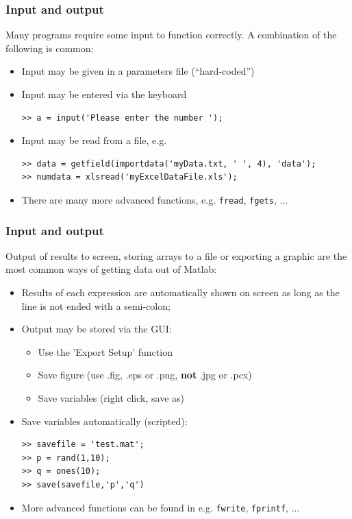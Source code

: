 \documentclass[11pt,table,final,fleqn,xcolor={usenames,dvipsnames},unknownkeysallowed,handout]{beamer}
\begin{document}
\begin{frame}[fragile]
 \frametitle{Input and output}
 Many programs require some input to function correctly. A combination of the following is common:
 \begin{itemize}[<+->]
   \item Input may be given in a parameters file (``hard-coded'')
   \item Input may be entered via the keyboard
   \begin{lstlisting}
>> a = input('Please enter the number ');
   \end{lstlisting}
   \item Input may be read from a file, e.g.
    \begin{lstlisting}
>> data = getfield(importdata('myData.txt, ' ', 4), 'data');
>> numdata = xlsread('myExcelDataFile.xls');
   \end{lstlisting}
   \item There are many more advanced functions, e.g. \lstinline$fread$, \lstinline$fgets$, ...
 \end{itemize}
\end{frame}

\begin{frame}[fragile]
 \frametitle{Input and output}
 Output of results to screen, storing arrays to a file or exporting a graphic are the most common ways of getting data out of Matlab:
 \begin{itemize}[<+->]
   \item Results of each expression are automatically shown on screen as long as the line is not ended with a semi-colon;
   \item Output may be stored via the GUI:
    \begin{itemize}
      \item Use the 'Export Setup' function
      \item Save figure (use .fig, .eps or .png, \textbf{not} .jpg or .pcx)
      \item Save variables (right click, save as)
    \end{itemize}
   \item Save variables automatically (scripted):
    \begin{lstlisting}
>> savefile = 'test.mat';
>> p = rand(1,10);
>> q = ones(10);
>> save(savefile,'p','q')
   \end{lstlisting}
   \item More advanced functions can be found in e.g.  \lstinline$fwrite$, \lstinline$fprintf$, ...
 \end{itemize}
\end{frame}
\end{document}

